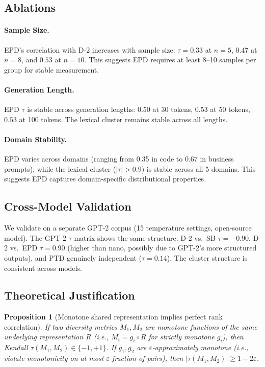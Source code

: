 \documentclass[11pt]{article}
\newtheorem{proposition}[theorem]{Proposition}
\begin{document}
\subsection{Ablations}

\paragraph{Sample Size.}
EPD's correlation with D-2 increases with sample size:
$\tau = 0.33$ at $n=5$, $0.47$ at $n=8$, and $0.53$ at $n=10$.
This suggests EPD requires at least 8--10 samples per group for
stable measurement.

\paragraph{Generation Length.}
EPD $\tau$ is stable across generation lengths:
$0.50$ at 30 tokens, $0.53$ at 50 tokens, $0.53$ at 100 tokens.
The lexical cluster remains stable across all lengths.

\paragraph{Domain Stability.}
EPD varies across domains (ranging from 0.35 in code to 0.67
in business prompts), while the lexical cluster ($|\tau| > 0.9$)
is stable across all 5 domains. This suggests EPD captures
domain-specific distributional properties.

\subsection{Cross-Model Validation}

We validate on a separate GPT-2 corpus (15 temperature settings,
open-source model). The GPT-2 $\tau$ matrix shows the same
structure: D-2 vs.\ SB $\tau = -0.90$, D-2 vs.\ EPD $\tau = 0.90$
(higher than nano, possibly due to GPT-2's more structured outputs),
and PTD genuinely independent ($\tau = 0.14$). The cluster structure
is consistent across models.

\subsection{Theoretical Justification}

\begin{proposition}[Monotone shared representation implies perfect rank correlation]
\label{prop:shared}
If two diversity metrics $M_1, M_2$ are monotone functions of the
same underlying representation $R$ (i.e., $M_i = g_i \circ R$ for
strictly monotone $g_i$), then Kendall $\tau(M_1, M_2) \in \{-1, +1\}$.
If $g_1, g_2$ are $\varepsilon$-approximately monotone (i.e., violate
monotonicity on at most $\varepsilon$ fraction of pairs), then
$|\tau(M_1, M_2)| \geq 1 - 2\varepsilon$.
\end{proposition}
\end{document}
